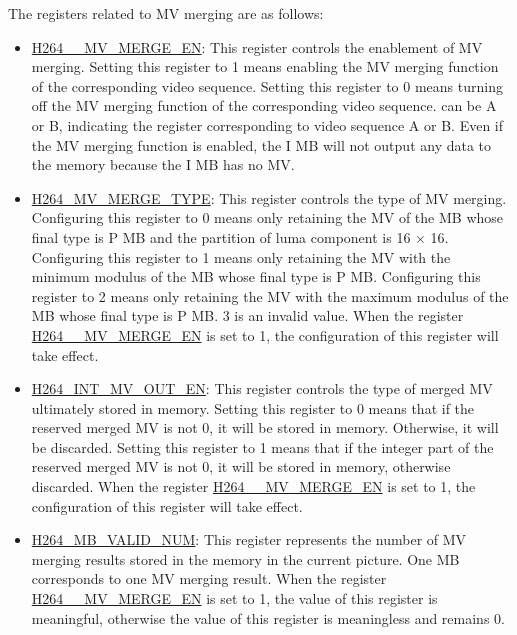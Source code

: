 \documentclass[main\_\_EN.tex]{subfiles}
\begin{document}
The registers related to MV merging are as follows:
\begin{itemize}
    \item \hyperref[fielddesc:H264AMVMERGEEN]{H264\_\_MV\_MERGE\_EN}: This register controls the enablement of MV merging. Setting this register to 1 means enabling the MV merging function of the corresponding video sequence. Setting this register to 0 means turning off the MV merging function of the corresponding video sequence.  can be A or B, indicating the register corresponding to video sequence A or B. Even if the MV merging function is enabled, the I MB will not output any data to the memory because the I MB has no MV.
    \item \hyperref[fielddesc:H264MVMERGETYPE]{H264\_MV\_MERGE\_TYPE}: This register controls the type of MV merging. Configuring this register to 0 means only retaining the MV of the MB whose final type is P MB and the partition of luma component is 16 × 16. Configuring this register to 1 means only retaining the MV with the minimum modulus of the MB whose final type is P MB. Configuring this register to 2 means only retaining the MV with the maximum modulus of the MB whose final type is P MB. 3 is an invalid value. When the register \hyperref[fielddesc:H264AMVMERGEEN]{H264\_\_MV\_MERGE\_EN} is set to 1, the configuration of this register will take effect.
    \item \hyperref[fielddesc:H264INTMVOUTEN]{H264\_INT\_MV\_OUT\_EN}: This register controls the type of merged MV ultimately stored in memory. Setting this register to 0 means that if the reserved merged MV is not 0, it will be stored in memory. Otherwise, it will be discarded. Setting this register to 1 means that if the integer part of the reserved merged MV is not 0, it will be stored in memory, otherwise discarded. When the register \hyperref[fielddesc:H264AMVMERGEEN]{H264\_\_MV\_MERGE\_EN} is set to 1, the configuration of this register will take effect.
    \item \hyperref[fielddesc:H264MBVALIDNUM]{H264\_MB\_VALID\_NUM}: This register represents the number of MV merging results stored in the memory in the current picture. One MB corresponds to one MV merging result. When the register \hyperref[fielddesc:H264AMVMERGEEN]{H264\_\_MV\_MERGE\_EN} is set to 1, the value of this register is meaningful, otherwise the value of this register is meaningless and remains 0.
\end{itemize}
\end{document}
